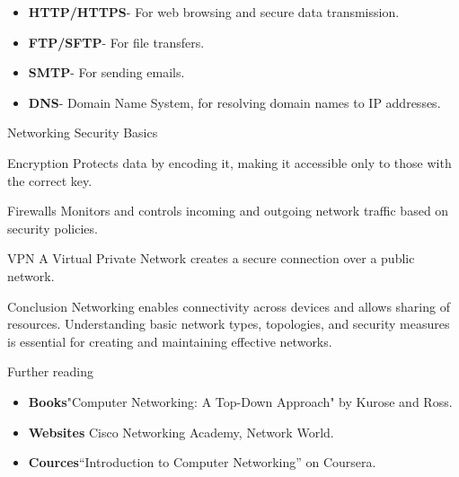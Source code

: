 \documentclass[11pt]{beamer}
\begin{document}
	\begin{frame}
		\begin{itemize}
		\item \textbf{HTTP/HTTPS}- For web browsing and secure data
		transmission.
		\item\textbf{FTP/SFTP}- For file transfers.
		\item \textbf{SMTP}- For sending emails.
		\item \textbf{DNS}- Domain Name System, for resolving domain names to
		IP addresses.
		\end{itemize}
	\end{frame}
	\begin{frame}
		{Networking Security Basics}
		\begin{block}{Encryption}
		Protects data by encoding it, making it accessible only to those
		with the correct key.
		\end{block}
		\begin{block}{Firewalls}
			Monitors and controls incoming and outgoing network traffic based
			on security policies.
		\end{block}
		\begin{block}{VPN}
			A Virtual Private Network creates a secure connection over a
			public network.
		\end{block}
	\end{frame}
	\begin{frame}
		{Conclusion}
		Networking enables connectivity across devices and allows sharing
		of resources. Understanding basic network types, topologies, and
		security measures is essential for creating and maintaining effective
		networks.





	\end{frame}
	\begin{frame}
		{Further reading}
		\begin{itemize}
			\item \textbf{Books}"Computer Networking: A Top-Down Approach" by
			Kurose and Ross.
			\item \textbf{Websites} Cisco Networking Academy, Network World.
			\item \textbf{Cources}“Introduction to Computer Networking” on
			Coursera.
		\end{itemize}
	\end{frame}
	
\end{document}
